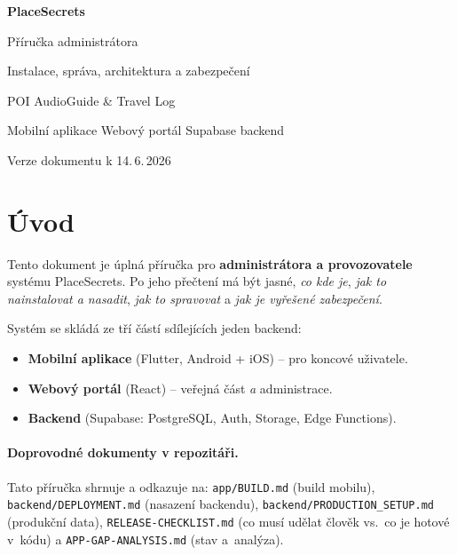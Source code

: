 \documentclass[11pt,a4paper]{article}
\newcommand{\code}[1]{\texttt{#1}}
\begin{document}
\begin{titlepage}
\centering
\vspace*{3cm}
{\Huge\bfseries\color{brand} PlaceSecrets\par}
\vspace{0.4cm}
{\LARGE Příručka administrátora\par}
\vspace{0.3cm}
{\large Instalace, správa, architektura a zabezpečení\par}
\vspace{2cm}
{\large POI AudioGuide \& Travel Log\par}
{\large Mobilní aplikace \textbullet{} Webový portál \textbullet{} Supabase backend\par}
\vfill
{\small Verze dokumentu k 14.\,6.\,2026\par}
\end{titlepage}

\tableofcontents
\newpage

\section{Úvod}
Tento dokument je úplná příručka pro \textbf{administrátora a provozovatele}
systému PlaceSecrets. Po jeho přečtení má být jasné, \emph{co kde je}, \emph{jak
to nainstalovat a nasadit}, \emph{jak to spravovat} a \emph{jak je vyřešené
zabezpečení}.

Systém se skládá ze tří částí sdílejících jeden backend:
\begin{itemize}[nosep]
  \item \textbf{Mobilní aplikace} (Flutter, Android + iOS) -- pro koncové uživatele.
  \item \textbf{Webový portál} (React) -- veřejná část \emph{a} administrace.
  \item \textbf{Backend} (Supabase: PostgreSQL, Auth, Storage, Edge Functions).
\end{itemize}

\paragraph{Doprovodné dokumenty v repozitáři.} Tato příručka shrnuje a odkazuje na:
\code{app/BUILD.md} (build mobilu), \code{backend/DEPLOYMENT.md} (nasazení
backendu), \code{backend/PRODUCTION\_SETUP.md} (produkční data),
\code{RELEASE-CHECKLIST.md} (co musí udělat člověk vs.\ co je hotové v~kódu) a
\code{APP-GAP-ANALYSIS.md} (stav a~analýza).
\end{document}
